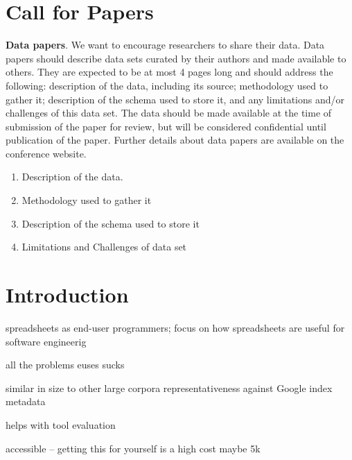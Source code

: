 \documentclass[conference]{IEEEtran}
\begin{document}
%
\IEEEpeerreviewmaketitle

\section{Call for Papers}

\textbf{Data papers}. We want to encourage researchers to share their data. Data papers should describe data sets curated by their authors and made available to others. They are expected to be at most 4 pages long and should address the following: description of the data, including its source; methodology used to gather it; description of the schema used to store it, and any limitations and/or challenges of this data set. The data should be made available at the time of submission of the paper for review, but will be considered confidential until publication of the paper. Further details about data papers are available on the conference website. 

\begin{enumerate}
\item Description of the data.
\item Methodology used to gather it
\item Description of the schema used to store it
\item Limitations and Challenges of data set
\end{enumerate}

\section{Introduction}

spreadsheets as end-user programmers; focus on how spreadsheets are useful for software engineerig


all the problems
euses sucks~~\cite{Fisher2005}

similar in size to other large corpora
representativeness against Google index
metadata

helps with tool evaluation

accessible -- getting this for yourself is a high cost maybe 5k
\end{document}
